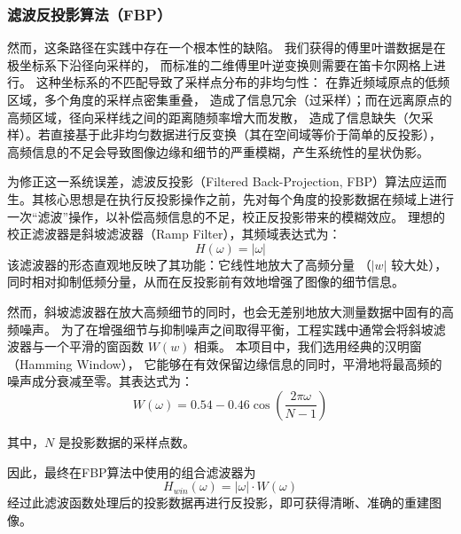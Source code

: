 \subsubsection{滤波反投影算法（FBP）}
然而，这条路径在实践中存在一个根本性的缺陷。
我们获得的傅里叶谱数据是在极坐标系下沿径向采样的，
而标准的二维傅里叶逆变换则需要在笛卡尔网格上进行。
这种坐标系的不匹配导致了采样点分布的非均匀性：
在靠近频域原点的低频区域，多个角度的采样点密集重叠，
造成了信息冗余（过采样）；而在远离原点的高频区域，径向采样线之间的距离随频率增大而发散，
造成了信息缺失（欠采样）。若直接基于此非均匀数据进行反变换（其在空间域等价于简单的反投影），
高频信息的不足会导致图像边缘和细节的严重模糊，产生系统性的星状伪影。
\par
为修正这一系统误差，滤波反投影（Filtered Back-Projection, FBP）算法应运而生。其核心思想是在执行反投影操作之前，先对每个角度的投影数据在频域上进行一次“滤波”操作，以补偿高频信息的不足，校正反投影带来的模糊效应。
理想的校正滤波器是斜坡滤波器（Ramp Filter），其频域表达式为：
\begin{equation*}
    H(\omega)=|\omega|
\end{equation*}
该滤波器的形态直观地反映了其功能：它线性地放大了高频分量 （$|w|$ 较大处），
同时相对抑制低频分量，从而在反投影前有效地增强了图像的细节信息。
\par

然而，斜坡滤波器在放大高频细节的同时，也会无差别地放大测量数据中固有的高频噪声。
为了在增强细节与抑制噪声之间取得平衡，工程实践中通常会将斜坡滤波器与一个平滑的窗函数 $W(w)$ 相乘。
本项目中，我们选用经典的汉明窗（Hamming Window），
它能够在有效保留边缘信息的同时，平滑地将最高频的噪声成分衰减至零。其表达式为：
\begin{equation*}
    W(\omega) = 0.54 - 0.46 \cos(\frac{2\pi \omega}{N-1})
\end{equation*}

其中，$N$ 是投影数据的采样点数。\par
因此，最终在FBP算法中使用的组合滤波器为 
\begin{equation*}
H_{win}(\omega)=|\omega|\cdot W(\omega)
\end{equation*}
经过此滤波函数处理后的投影数据再进行反投影，即可获得清晰、准确的重建图像。




